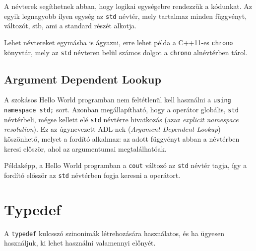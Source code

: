 \documentclass[../cpp_book/cpp_book.tex]{subfiles}
\begin{document}
	A névterek segíthetnek abban, hogy logikai egységebre rendezzük a kódunkat. Az egyik legnagyobb ilyen egység az \texttt{std} névtér, mely tartalmaz minden függvényt, változót, stb, ami a standard részét alkotja. 
	
	Lehet névtereket egymásba is ágyazni, erre lehet példa a C++11-es \texttt{chrono} könyvtár, mely az \texttt{std} névteren belül számos dolgot a \texttt{chrono} alnévtérben tárol.
	\subsection{Argument Dependent Lookup}
	A szokásos Hello World programban nem feltétlenül kell használni a \texttt{using namespace std;} sort. Azonban megállapítható, hogy a \texttt{\<} operátor globális, \texttt{std} névtérbeli, mégse kellett elé \texttt{std} névtérre hivatkozás (azaz \textit{explicit namespace resolution}). Ez az úgynevezett ADL-nek (\textit{Argument Dependent Lookup}) köszönhető, melyet a fordító alkalmaz: az adott függvényt abban a névtérben keresi először, ahol az argumentumai megtalálhatóak.
	
	\smallskip
	Példaképp, a Hello World programban a \texttt{cout} változó az \texttt{std} névtér tagja, így a fordító először az \texttt{std} névtérben fogja keresni a \texttt{\<} operátort.
	\section{Typedef}
	A \texttt{typedef} kulcsszó szinonimák létrehozására használatos, és ha ügyesen használjuk, ki lehet használni valamennyi előnyét. 
	
\end{document}
